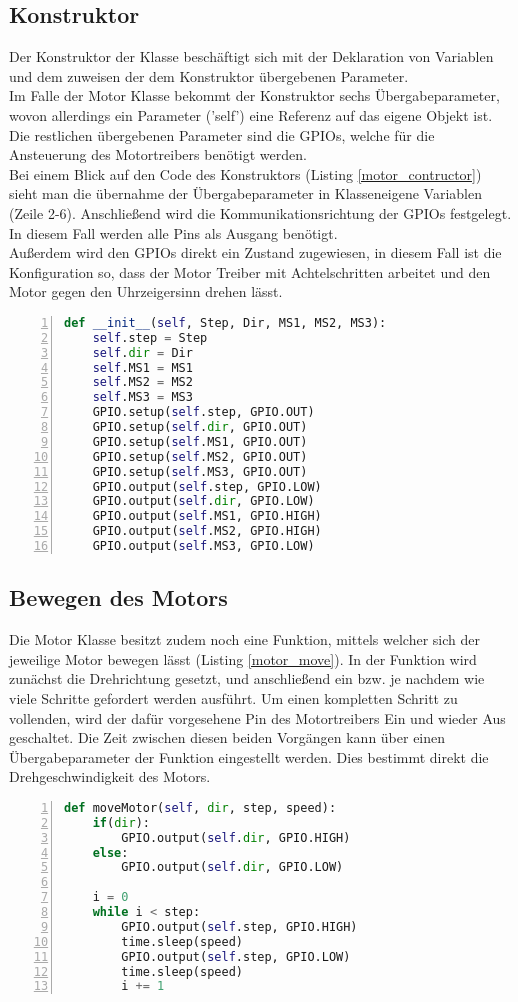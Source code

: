 \subsection{Konstruktor} 
Der Konstruktor der Klasse beschäftigt sich mit der Deklaration von Variablen und dem zuweisen der dem Konstruktor übergebenen Parameter.\\
Im Falle der Motor Klasse bekommt der Konstruktor sechs Übergabeparameter, wovon allerdings ein Parameter ('self') eine Referenz auf das eigene Objekt ist.\\
Die restlichen übergebenen Parameter sind die \acp{GPIO}, welche für die Ansteuerung des Motortreibers benötigt werden.\\
Bei einem Blick auf den Code des Konstruktors (Listing \ref{motor_contructor}) sieht man die übernahme der Übergabeparameter in Klasseneigene Variablen (Zeile 2-6). Anschließend wird die Kommunikationsrichtung der \acp{GPIO} festgelegt. In diesem Fall werden alle Pins als Ausgang benötigt.\\
Außerdem wird den \acp{GPIO} direkt ein Zustand zugewiesen, in diesem Fall ist die Konfiguration so, dass der Motor Treiber mit Achtelschritten arbeitet und den Motor gegen den  Uhrzeigersinn drehen lässt.
\begin{lstlisting}[caption={Konstruktor der Motor Klasse}, language={Python}, label={motor_contructor}, numbers=left]
def __init__(self, Step, Dir, MS1, MS2, MS3):
    self.step = Step
    self.dir = Dir
    self.MS1 = MS1
    self.MS2 = MS2
    self.MS3 = MS3
    GPIO.setup(self.step, GPIO.OUT)
    GPIO.setup(self.dir, GPIO.OUT)
    GPIO.setup(self.MS1, GPIO.OUT)
    GPIO.setup(self.MS2, GPIO.OUT)
    GPIO.setup(self.MS3, GPIO.OUT)
    GPIO.output(self.step, GPIO.LOW)
    GPIO.output(self.dir, GPIO.LOW)
    GPIO.output(self.MS1, GPIO.HIGH)
    GPIO.output(self.MS2, GPIO.HIGH)
    GPIO.output(self.MS3, GPIO.LOW)
\end{lstlisting}

\subsection{Bewegen des Motors}
Die Motor Klasse besitzt zudem noch eine Funktion, mittels welcher sich der jeweilige Motor bewegen lässt (Listing \ref{motor_move}). In der Funktion wird zunächst die Drehrichtung gesetzt, und anschließend ein bzw. je nachdem wie viele Schritte gefordert werden ausführt. Um einen kompletten Schritt zu vollenden, wird der dafür vorgesehene Pin des Motortreibers Ein und wieder Aus geschaltet. Die Zeit zwischen diesen beiden Vorgängen kann über einen Übergabeparameter der Funktion eingestellt werden. Dies bestimmt direkt die Drehgeschwindigkeit des Motors.
\begin{lstlisting}[caption={Funktion zum Bewegen des Motors}, language={Python}, label={motor_move}, numbers=left]
def moveMotor(self, dir, step, speed):
    if(dir):
        GPIO.output(self.dir, GPIO.HIGH)
    else:
        GPIO.output(self.dir, GPIO.LOW)

    i = 0
    while i < step:
        GPIO.output(self.step, GPIO.HIGH)
        time.sleep(speed)
        GPIO.output(self.step, GPIO.LOW)
        time.sleep(speed)
        i += 1
\end{lstlisting}



